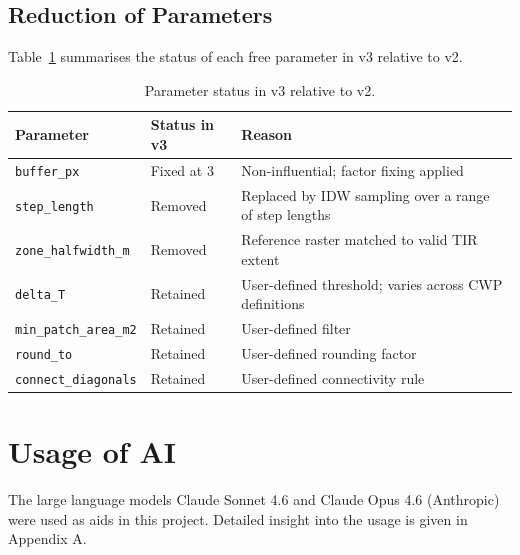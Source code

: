 \subsection{Reduction of Parameters}

Table~\ref{tab:parameter_reduction} summarises the status of each free parameter 
in v3 relative to v2.

\begin{table}[H]
	\centering
	\caption{Parameter status in v3 relative to v2.}
	\label{tab:parameter_reduction}
	\begin{tabular}{@{}lll@{}}
		\toprule
		\textbf{Parameter} & \textbf{Status in v3} & \textbf{Reason} \\
		\midrule
		\texttt{buffer\_px} & Fixed at 3 & Non-influential; factor fixing applied \\
		\texttt{step\_length} & Removed & Replaced by IDW sampling over a range of step lengths \\
		\texttt{zone\_halfwidth\_m} & Removed & Reference raster matched to valid TIR extent \\
		\texttt{delta\_T} & Retained & User-defined threshold; varies across CWP definitions \\
		\texttt{min\_patch\_area\_m2} & Retained & User-defined filter \\
		\texttt{round\_to} & Retained & User-defined rounding factor \\
		\texttt{connect\_diagonals} & Retained & User-defined connectivity rule \\
		\bottomrule
	\end{tabular}
\end{table}

\section{Usage of AI}

The large language models Claude Sonnet 4.6 and Claude Opus 4.6 (Anthropic) 
were used as aids in this project. Detailed insight into the usage is given 
in Appendix A.


